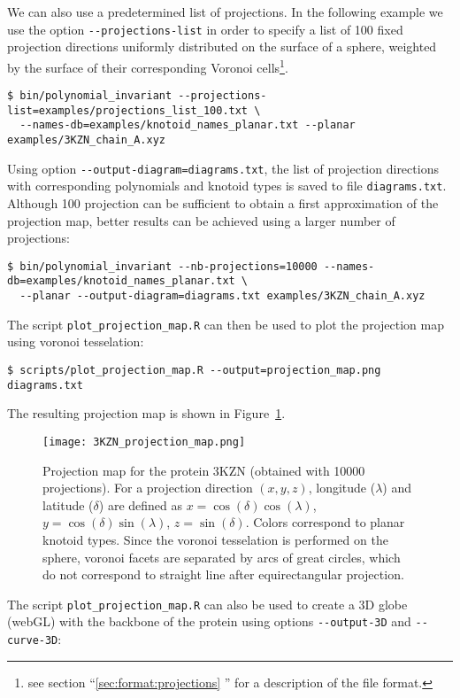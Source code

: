 We can also use a predetermined list of projections. In the following example we use the option \lstinline{--projections-list} in order to specify a list of 100 fixed projection directions uniformly distributed on the surface of a sphere, weighted by the surface of their corresponding Voronoi cells\footnote{see section ``\ref{sec:format:projections} '' for a description of the file format.}. 
\begin{lstlisting}
$ bin/polynomial_invariant --projections-list=examples/projections_list_100.txt \
  --names-db=examples/knotoid_names_planar.txt --planar examples/3KZN_chain_A.xyz
\end{lstlisting}

Using option \lstinline{--output-diagram=diagrams.txt}, the list of projection directions with corresponding polynomials and knotoid types is saved to file \lstinline{diagrams.txt}. Although 100 projection can be sufficient to obtain a first approximation of the projection map, better results can be achieved using a larger number of projections:
\begin{lstlisting}
$ bin/polynomial_invariant --nb-projections=10000 --names-db=examples/knotoid_names_planar.txt \
  --planar --output-diagram=diagrams.txt examples/3KZN_chain_A.xyz
\end{lstlisting}
The script \lstinline{plot_projection_map.R} can then be used to plot the projection map using voronoi tesselation:
\begin{lstlisting}
$ scripts/plot_projection_map.R --output=projection_map.png diagrams.txt
\end{lstlisting}
The resulting projection map is shown in Figure~\ref{fig:3KZN:projectionmap}.
\begin{figure}[t]
\centering
\texttt{[image: 3KZN\_projection\_map.png]}
\caption{Projection map for the protein 3KZN (obtained with 10000 projections).  For a projection direction $(x,y,z)$, longitude ($\lambda$) and latitude ($\delta$) are defined as $x=\cos(\delta)\cos(\lambda)$, $y=\cos(\delta)\sin(\lambda)$, $z=\sin(\delta)$. Colors correspond to planar knotoid types. Since the voronoi tesselation is performed on the sphere, voronoi facets are separated by arcs of great circles, which do not correspond to straight line after equirectangular projection.}\label{fig:3KZN:projectionmap}
\end{figure}
The script \lstinline{plot_projection_map.R} can also be used to create a 3D globe (webGL) with the backbone of the protein using options \lstinline{--output-3D} and \lstinline{--curve-3D}:
